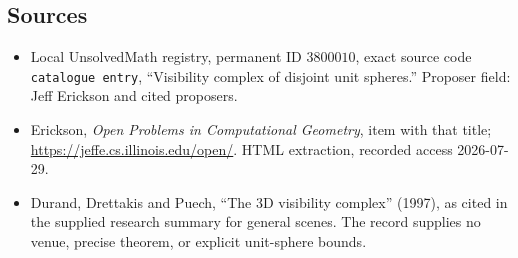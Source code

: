 \documentclass[11pt]{article}
\begin{document}
\subsection{Sources}
\begin{itemize}
\item Local UnsolvedMath registry, permanent ID \(3800010\), exact source code \texttt{catalogue entry}, ``Visibility complex of disjoint unit spheres.'' Proposer field: Jeff Erickson and cited proposers.
\item Erickson, \emph{Open Problems in Computational Geometry}, item with that title; \url{https://jeffe.cs.illinois.edu/open/}. HTML extraction, recorded access 2026-07-29.
\item Durand, Drettakis and Puech, ``The 3D visibility complex'' (1997), as cited in the supplied research summary for general scenes. The record supplies no venue, precise theorem, or explicit unit-sphere bounds.
\end{itemize}
\end{document}
